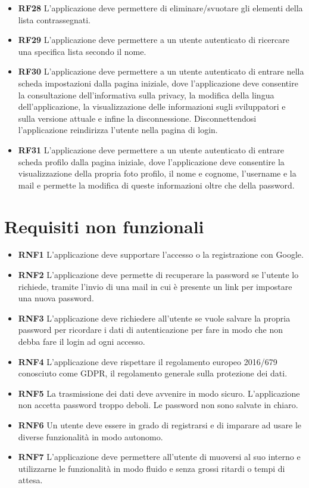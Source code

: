 \documentclass[a4paper,12pt]{article}
\begin{document}
\begin{itemize}
\item \textbf {\hypertarget{RF28}{RF28}} L'applicazione deve permettere di eliminare/svuotare gli elementi della lista contrassegnati.
\item \textbf {\hypertarget{RF29}{RF29}} L'applicazione deve permettere a un utente autenticato di ricercare una specifica lista secondo il nome.
\item \textbf {\hypertarget{RF30}{RF30}}  L'applicazione deve permettere a un utente autenticato di entrare nella scheda impostazioni dalla pagina iniziale, dove l'applicazione deve consentire la consultazione dell'informativa sulla privacy, la modifica della lingua dell'applicazione, la visualizzazione delle informazioni sugli sviluppatori e sulla versione attuale e infine la disconnessione. Disconnettendosi l'applicazione reindirizza l'utente nella pagina di login.
\item \textbf {\hypertarget{RF31}{RF31}}  L'applicazione deve permettere a un utente autenticato di entrare scheda profilo dalla pagina iniziale, dove l'applicazione deve consentire la visualizzazione della propria foto profilo, il nome e cognome, l'username e la mail e permette la modifica di queste informazioni oltre che della password.
\end{itemize}
\newpage
\section*{Requisiti non funzionali}
\begin{itemize} \setlength\itemsep{0.01em}

\item \textbf {\hypertarget{RNF1}{RNF1}}  L'applicazione deve supportare l'accesso o la registrazione con Google.
\item \textbf {\hypertarget{RNF2}{RNF2}}  L'applicazione deve permette di recuperare la password se l'utente lo richiede, tramite l'invio di una mail in cui è presente un link per impostare una nuova password.
\item \textbf {\hypertarget{RNF3}{RNF3}}  L'applicazione deve richiedere all'utente se vuole salvare la propria password per ricordare i dati di autenticazione per fare in modo che non debba fare il login ad ogni accesso.
\item \textbf {\hypertarget{RNF4}{RNF4}} L'applicazione deve rispettare il regolamento europeo 2016/679 conosciuto come GDPR, il regolamento generale sulla protezione dei dati.
\item \textbf {\hypertarget{RNF5}{RNF5}} 
La trasmissione dei dati deve avvenire in modo sicuro.
L'applicazione non accetta password troppo deboli.
Le password non sono salvate in chiaro.
\item \textbf {\hypertarget{RNF6}{RNF6}} Un utente deve essere in grado di registrarsi e di imparare ad usare le diverse funzionalità in modo autonomo.
\item \textbf {\hypertarget{RNF7}{RNF7}} L'applicazione deve permettere all'utente di muoversi al suo interno e utilizzarne le funzionalità in modo fluido e senza grossi ritardi o tempi di attesa.

\end{itemize}
\newpage
\end{document}
